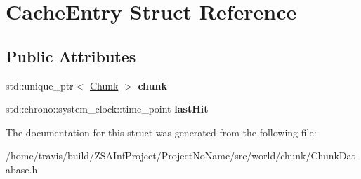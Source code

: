 \hypertarget{structCacheEntry}{\section{Cache\-Entry Struct Reference}
\label{structCacheEntry}
}
\subsection*{Public Attributes}
\begin{DoxyCompactItemize}
\item 
\hypertarget{structCacheEntry_aee492f9285bb4a0415414628bd484e5b}{std\-::unique\-\_\-ptr$<$ \hyperlink{classChunk}{Chunk} $>$ {\bfseries chunk}}\label{structCacheEntry_aee492f9285bb4a0415414628bd484e5b}

\item 
\hypertarget{structCacheEntry_a2f38d76a011b952a0d4d3acbbb88b747}{std\-::chrono\-::system\-\_\-clock\-::time\-\_\-point {\bfseries last\-Hit}}\label{structCacheEntry_a2f38d76a011b952a0d4d3acbbb88b747}

\end{DoxyCompactItemize}


The documentation for this struct was generated from the following file\-:\begin{DoxyCompactItemize}
\item 
/home/travis/build/\-Z\-S\-A\-Inf\-Project/\-Project\-No\-Name/src/world/chunk/Chunk\-Database.\-h\end{DoxyCompactItemize}
